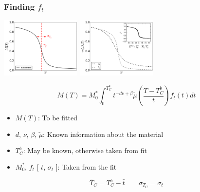 \documentclass{beamer}
\begin{document}
\begin{frame}
	\frametitle{Finding $f_t$}
		
	\begin{center}
	\includegraphics[width=4cm]{Images/Aggregate} \hspace{3mm}
	\includegraphics[width=4cm]{Images/Ds}
	
	$$
	M(T) = M_0^*\int_0^{T_C^b} t^{-d\nu +\beta} \tilde{\mu}\left(\frac{T-T_C^b}{t}\right) f_t(t) dt
	$$
	
	\begin{itemize}
		\item{$M(T)$: To be fitted}
		\item{$d$, $\nu$, $\beta$, $\tilde{\mu}$: Known information about the material}
		\item{$T_C^b$: May be known, otherwise taken from fit}
		\item{$M_0^*$, $f_t$ [ $\bar{t}$, $\sigma_t$ ]: Taken from the fit}
	\end{itemize}
	
	$$
	\bar{T}_C = T_C^b - \bar{t} \quad \quad \sigma_{T_C} = \sigma_t
	$$
	
	\end{center}
\end{frame}
\end{document}

